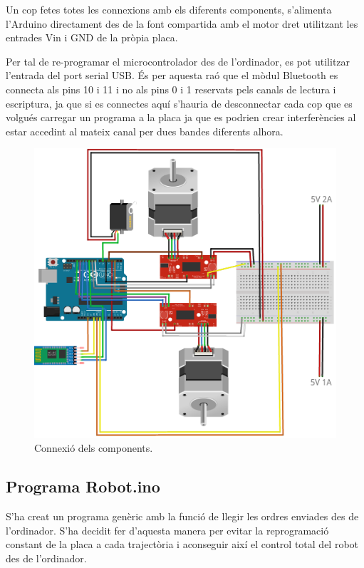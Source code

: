 Un cop fetes totes les connexions amb els diferents components, s’alimenta l’Arduino directament des de la font compartida amb el motor dret utilitzant les entrades Vin i GND de la pròpia placa. 

Per tal de re-programar el microcontrolador des de l’ordinador, es pot utilitzar l’entrada del port serial USB. És per aquesta raó que el mòdul Bluetooth es connecta als pins 10 i 11 i no als pins 0 i 1 reservats pels canals de lectura i escriptura, ja que si es connectes aquí s’hauria de desconnectar cada cop que es volgués carregar un programa a la placa ja que es podrien crear interferències al estar accedint al mateix canal per dues bandes diferents alhora. 
\begin{figure}[H]
	\centering
	\includegraphics[scale=0.5]{RobotFritz}
	\caption{Connexió dels components.}
	\label{fig:connexio}
\end{figure}
\subsection{Programa Robot.ino}

S’ha creat un programa genèric amb la funció de llegir les ordres enviades des de l’ordinador. S’ha decidit fer d’aquesta manera per evitar la reprogramació constant de la placa a cada trajectòria i aconseguir així el control total del robot des de l’ordinador. 

